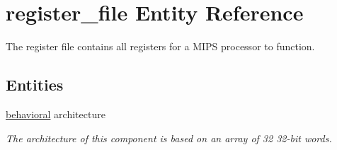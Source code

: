 \hypertarget{classregister__file}{\section{register\-\_\-file \-Entity \-Reference}
\label{classregister__file}
}


\-The register file contains all registers for a \-M\-I\-P\-S processor to function.  


\subsection*{\-Entities}
\begin{DoxyCompactItemize}
\item 
\hyperlink{classregister__file_1_1behavioral}{behavioral} architecture
\begin{DoxyCompactList}\small\item\em \-The architecture of this component is based on an array of 32 32-\/bit words. \end{DoxyCompactList}\end{DoxyCompactItemize}
\*
\*
